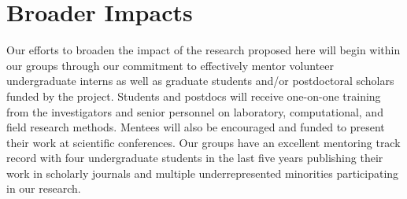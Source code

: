 \section*{Broader Impacts}

Our efforts to broaden the impact of the research proposed here will begin within our groups through our commitment to effectively mentor volunteer undergraduate interns as well as graduate students and/or postdoctoral scholars funded by the project. Students and postdocs will receive one-on-one training from the investigators and senior personnel on laboratory, computational, and field research methods.  Mentees will also be encouraged and funded to present their work at scientific conferences.  Our groups have an excellent mentoring track record with four undergraduate students in the last five years publishing their work in scholarly journals and multiple underrepresented minorities participating in our research.


%	
%

